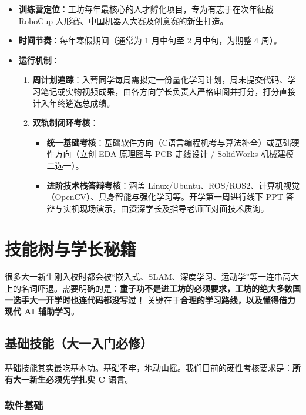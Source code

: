 \documentclass[a4paper,11pt,oneside]{scrreprt}
\begin{document}
\begin{itemize}
    \item \textbf{训练营定位}：工坊每年最核心的人才孵化项目，专为有志于在次年征战 RoboCup 人形赛、中国机器人大赛及创意赛的新生打造。
    \item \textbf{时间节奏}：每年寒假期间（通常为 1 月中旬至 2 月中旬，为期整 4 周）。
    \item \textbf{运行机制}：
    \begin{enumerate}
        \item \textbf{周计划追踪}：入营同学每周需拟定一份量化学习计划，周末提交代码、学习笔记或实物视频成果，由各方向学长负责人严格审阅并打分，打分直接计入年终遴选总成绩。
        \item \textbf{双轨制闭环考核}：
        \begin{itemize}
            \item \textbf{统一基础考核}：基础软件方向（C语言编程机考与算法补全）或基础硬件方向（立创 EDA 原理图与 PCB 走线设计 / SolidWorks 机械建模二选一）。
            \item \textbf{进阶技术栈答辩考核}：涵盖 Linux/Ubuntu、ROS/ROS2、计算机视觉（OpenCV）、具身智能与强化学习等。开学第一周进行线下 PPT 答辩与实机现场演示，由资深学长及指导老师面对面技术质询。
        \end{itemize}
    \end{enumerate}
\end{itemize}

\chapter{技能树与学长秘籍}

很多大一新生刚入校时都会被“嵌入式、SLAM、深度学习、运动学”等一连串高大上的名词吓退。需要明确的是：\textbf{童子功不是进工坊的必须要求，工坊的绝大多数国一选手大一开学时也连代码都没写过！} 关键在于\textbf{合理的学习路线，以及懂得借力现代 AI 辅助学习}。

\section{基础技能（大一入门必修）}

基础技能其实最吃基本功。基础不牢，地动山摇。我们目前的硬性考核要求是：\textbf{所有大一新生必须先学扎实 C 语言}。

\subsection{软件基础}
\end{document}
